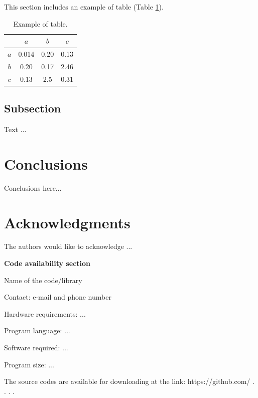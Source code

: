 \documentclass[a4paper,fleqn]{cas-sc}
\begin{document}
This section includes an example of table (Table \ref{tab:Table1}).

\begin{table}
\centering
\caption{Example of table.}
\label{tab:Table1}
\begin{tabular}{ |c||c|c|c|} 
 \hline
     & $a$  &  $b$  &  $c$\\ 
 \hline 
 \hline
$a$ & 0.014 &  0.20    &   0.13  \\
\hline
$b$ & 0.20    &   0.17    &   2.46    \\
\hline
$c$ & 0.13    &   2.5     &   0.31   \\
\hline
\end{tabular} 
\end{table}


\subsection{Subsection}

Text ...

\section{Conclusions}

Conclusions here...

\section{Acknowledgments}

The authors would like to acknowledge ...

\newpage

\textbf{Code availability section}

Name of the code/library

Contact: e-mail and phone number

Hardware requirements: ...

Program language: ...
 
Software required: ...

Program size: ...

The source codes are available for downloading at the link:
https://github.com/ . . . . 



 
\end{document}
